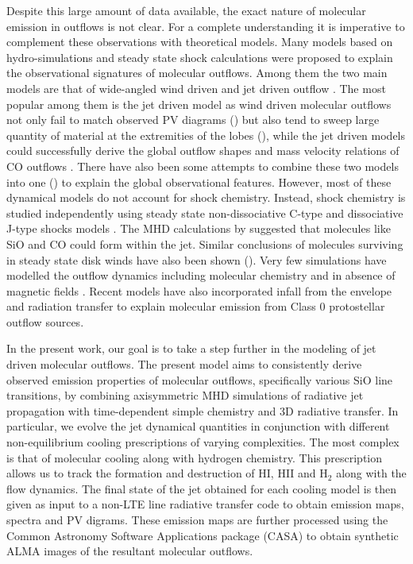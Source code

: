 \documentclass[useAMS,usenatbib]{mn2e}
\begin{document}
Despite this large amount of data available, the exact nature of
molecular emission in outflows is not clear. For a complete understanding it is imperative
to complement these observations with theoretical models. Many models
based on hydro-simulations and steady state shock calculations
were proposed to explain the observational signatures of molecular
outflows. Among them the two main models are that of wide-angled wind
driven \citep{Shu:1991p14071} and jet driven outflow
\citep{Canto:1991p14123}. 
The most popular among them is the jet driven model as wind
driven molecular outflows not only fail to match observed PV diagrams (\citealt{Cabrit:1992p14098})
but also tend to sweep large quantity of material at the extremities
of the lobes (\citealt{Masson:1992p14101}), while the jet driven models could successfully
derive the global outflow shapes and mass velocity relations of CO
outflows \citep{Raga:1993p9948,
  Masson:1993p9661,Downes:2003p9946,Downes:2007p9514}. 
There have also been some attempts to combine these two
models into one (\citealt{Shang:2006p14268}) to explain the global observational features. 
However, most of these dynamical models do not
account for shock chemistry. Instead, shock chemistry is studied
independently using steady state non-dissociative C-type and
dissociative J-type shocks models \citep{Neufeld:1989p11689, Schilke:1997p14140,Flower:2003p11236}. 
The MHD calculations by \cite{Glassgold:1991p13703} suggested that molecules
like SiO and CO could form within the jet. Similar conclusions of
molecules surviving in steady state disk winds have also been shown
(\citealt{Panoglou:2012p10039}). 
Very few simulations have modelled the outflow
dynamics including molecular chemistry and in absence of
magnetic fields \citep{Raga:1995p12965, Smith:2003p9985}. 
Recent models have also incorporated
infall from the envelope \citep{Rawlings:2013p14920} and radiation
transfer \citep{Offner:2011p14861} to explain molecular 
emission from Class 0 protostellar outflow sources. 



%
In the present work, our goal is to take a step further in the modeling of
jet driven molecular outflows. The present model aims to consistently derive observed emission properties of molecular outflows, specifically various SiO line
transitions, by combining axisymmetric MHD simulations of
radiative jet propagation with time-dependent simple chemistry and 3D radiative
transfer. In particular, we evolve the jet dynamical
quantities in conjunction with different non-equilibrium cooling
prescriptions of varying complexities. The most complex is that of
molecular cooling along with hydrogen chemistry. This prescription
allows us to track the formation and destruction of 
HI, HII and H$_{2}$ along with the flow dynamics. 
The final state of the jet obtained for each cooling model is then
given as input to a non-LTE line radiative transfer code
to obtain emission maps, spectra and PV digrams. These emission maps
are further processed using the Common Astronomy Software Applications
package (CASA) to obtain synthetic ALMA images of the resultant molecular outflows.
%
\end{document}
